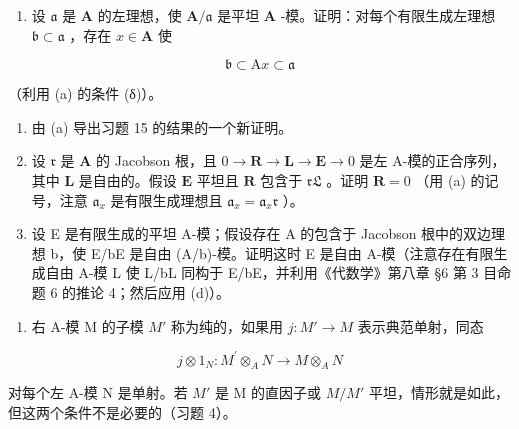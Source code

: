 \begin{enumerate}
\def\labelenumi{(\alph{enumi})}
\setcounter{enumi}{1}
\tightlist
\item
  设 \(\mathfrak{a}\) 是 \(\mathbf{A}\) 的左理想，使 \(\mathbf{A} / \mathfrak{a}\) 是平坦 \(\mathbf{A}\) -模。证明：对每个有限生成左理想 \(\mathfrak{b} \subset \mathfrak{a}\) ，存在 \(x \in \mathbf{A}\) 使
\end{enumerate}

\[
\mathfrak {b} \subset \mathrm{A} x \subset \mathfrak {a}
\]

（利用 (a) 的条件 (δ)）。

\begin{enumerate}
\def\labelenumi{(\alph{enumi})}
\setcounter{enumi}{2}
\item
  由 (a) 导出习题 15 的结果的一个新证明。
\item
  设 \(\mathfrak{r}\) 是 \(\mathbf{A}\) 的 Jacobson 根，且 \(0 \to \mathbf{R} \to \mathbf{L} \to \mathbf{E} \to 0\) 是左 A-模的正合序列，其中 \(\mathbf{L}\) 是自由的。假设 \(\mathbf{E}\) 平坦且 \(\mathbf{R}\) 包含于 \(\mathfrak{rL}\) 。证明 \(\mathbf{R} = 0\) （用 (a) 的记号，注意 \(\mathfrak{a}_x\) 是有限生成理想且 \(\mathfrak{a}_x = \mathfrak{a}_x\mathfrak{r}\) ）。
\item
  设 E 是有限生成的平坦 A-模；假设存在 A 的包含于 Jacobson 根中的双边理想 b，使 E/bE 是自由 (A/b)-模。证明这时 E 是自由 A-模（注意存在有限生成自由 A-模 L 使 L/bL 同构于 E/bE，并利用《代数学》第八章 §6 第 3 目命题 6 的推论 4；然后应用 (d)）。
\end{enumerate}

\begin{enumerate}
\def\labelenumi{\arabic{enumi}.}
\setcounter{enumi}{23}
\tightlist
\item
右 A-模 M 的子模 \(M'\) 称为纯的，如果用 \(j: M' \rightarrow M\) 表示典范单射，同态
\end{enumerate}

\[
j \otimes 1 _ {N} \colon M ^ {\prime} \otimes_ {A} N \rightarrow M \otimes_ {A} N
\]

对每个左 A-模 N 是单射。若 \(M'\) 是 M 的直因子或 \(M/M'\) 平坦，情形就是如此，但这两个条件不是必要的（习题 4）。

